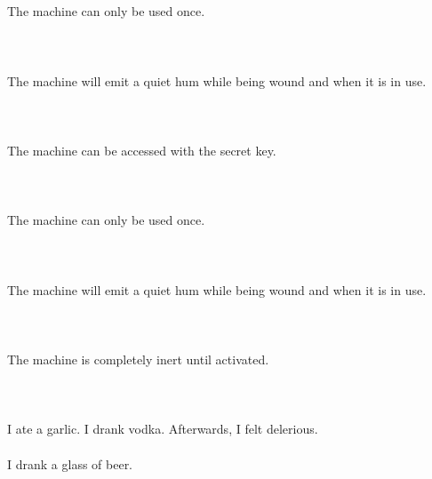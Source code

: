 \documentclass{article}
\begin{document}
    \section{}
    The machine can only be used once.\\\\ 
    \newpage
    
    \section{}
    The machine will emit a quiet hum while being wound and when it is in use.\\\\ 
    \newpage
    
    \section{}
    The machine can be accessed with the secret key.\\\\ 
    \newpage
    
    \section{}
    The machine can only be used once.\\\\ 
    \newpage
    
    \section{}
    The machine will emit a quiet hum while being wound and when it is in use.\\\\ 
    \newpage
    
    \section{}
    The machine is completely inert until activated.\\\\ 
    \newpage
    
    \section{}
    I ate a garlic. I drank vodka. Afterwards, I felt delerious.\\\\I drank a glass of beer.\\\\ 
    \newpage
    
\end{document}
